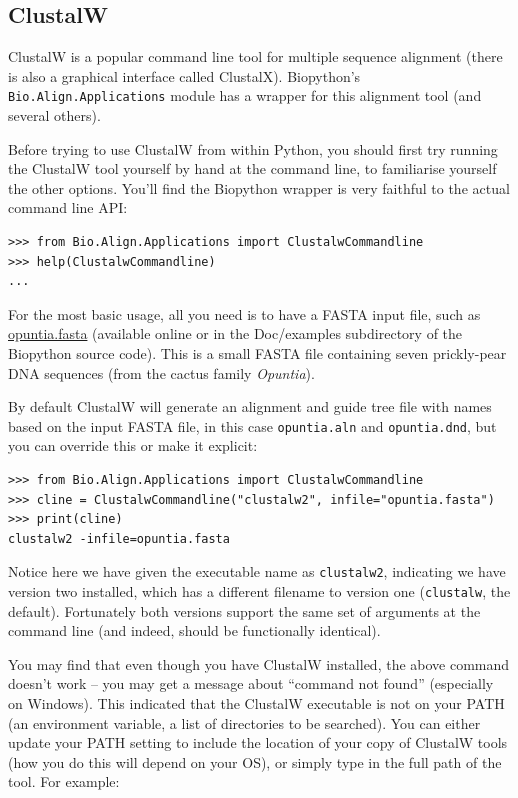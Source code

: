 \documentclass{report}
\begin{document}
\subsection{ClustalW}
\label{sec:align_clustal}
ClustalW is a popular command line tool for multiple sequence alignment
(there is also a graphical interface called ClustalX). Biopython's
\verb|Bio.Align.Applications| module has a wrapper for this alignment tool
(and several others).

Before trying to use ClustalW from within Python, you should first try running
the ClustalW tool yourself by hand at the command line, to familiarise
yourself the other options. You'll find the Biopython wrapper is very
faithful to the actual command line API:

\begin{verbatim}
>>> from Bio.Align.Applications import ClustalwCommandline
>>> help(ClustalwCommandline)
...
\end{verbatim}

For the most basic usage, all you need is to have a FASTA input file, such as
\href{http://biopython.org/DIST/docs/tutorial/examples/opuntia.fasta}{opuntia.fasta}
(available online or in the Doc/examples subdirectory of the Biopython source
code). This is a small FASTA file containing seven prickly-pear DNA sequences
(from the cactus family \textit{Opuntia}).

By default ClustalW will generate an alignment and guide tree file with names
based on the input FASTA file, in this case \texttt{opuntia.aln} and
\texttt{opuntia.dnd}, but you can override this or make it explicit:

\begin{verbatim}
>>> from Bio.Align.Applications import ClustalwCommandline
>>> cline = ClustalwCommandline("clustalw2", infile="opuntia.fasta")
>>> print(cline)
clustalw2 -infile=opuntia.fasta
\end{verbatim}

Notice here we have given the executable name as \texttt{clustalw2},
indicating we have version two installed, which has a different filename to
version one (\texttt{clustalw}, the default). Fortunately both versions
support the same set of arguments at the command line (and indeed, should be
functionally identical).

You may find that even though you have ClustalW installed, the above command
doesn't work -- you may get a message about ``command not found'' (especially
on Windows). This indicated that the ClustalW executable is not on your PATH
(an environment variable, a list of directories to be searched). You can
either update your PATH setting to include the location of your copy of
ClustalW tools (how you do this will depend on your OS), or simply type in
the full path of the tool. For example:
\end{document}
